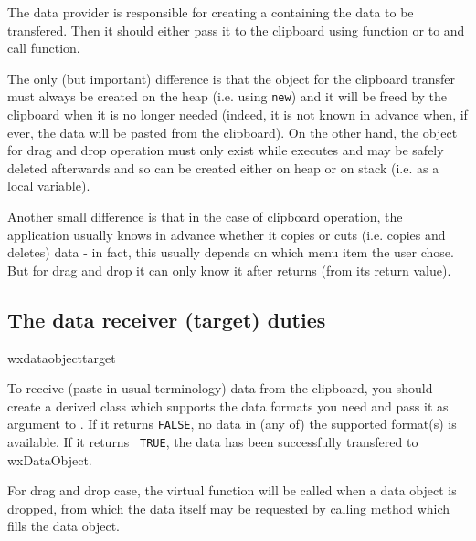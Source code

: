 The data provider is responsible for creating a 
 containing the data to be
transfered. Then it should either pass it to the clipboard using 
 function or to 
 and call 
 function.

The only (but important) difference is that the object for the clipboard
transfer must always be created on the heap (i.e. using {\tt new}) and it will
be freed by the clipboard when it is no longer needed (indeed, it is not known
in advance when, if ever, the data will be pasted from the clipboard). On the
other hand, the object for drag and drop operation must only exist while 
 executes and may be safely deleted
afterwards and so can be created either on heap or on stack (i.e. as a local
variable).

Another small difference is that in the case of clipboard operation, the
application usually knows in advance whether it copies or cuts (i.e. copies and
deletes) data - in fact, this usually depends on which menu item the user
chose. But for drag and drop it can only know it after 
 returns (from its return value).

\subsection{The data receiver (target) duties}{wxdataobjecttarget}

To receive (paste in usual terminology) data from the clipboard, you should
create a  derived class which supports the
data formats you need and pass it as argument to 
. If it returns {\tt FALSE},
no data in (any of) the supported format(s) is available. If it returns {\tt
TRUE}, the data has been successfully transfered to wxDataObject.

For drag and drop case, the  
virtual function will be called when a data object is dropped, from which the
data itself may be requested by calling 
 method which fills
the data object.


